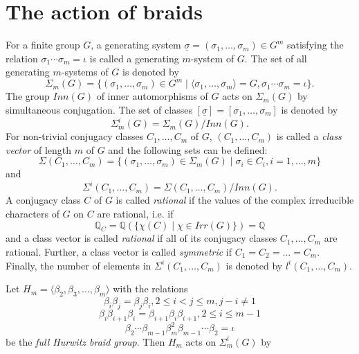 \documentclass[12pt,a4paper]{article}
\numberwithin{equation}{section}
\numberwithin{table}{section}
\begin{document}
\section{The action of braids}\label{SectionTheActionOfBraids}

For a finite group $G$, a generating system $\underline{\sigma} = (\sigma_1, \dots, \sigma_m) \in G^m$ satisfying
the relation $\sigma_1 \cdots \sigma_m = \iota$ is called a generating $m$-system of $G$.
The set of all generating $m$-systems of $G$ is denoted by
$$\Sigma_m(G) = \{ (\sigma_1, \dots, \sigma_m) \in G^m \mid \langle \sigma_1, \dots, \sigma_m \rangle = G,
\sigma_1 \cdots \sigma_m = \iota \}.$$
The group $Inn(G)$ of inner automorphisms of $G$ acts on $\Sigma_m(G)$ by simultaneous conjugation. 
The set of classes $[\underline{\sigma}] = [\sigma_1, \dots, \sigma_m]$ is denoted by
$$\Sigma^i_m(G) = \Sigma_m(G)/Inn(G).$$
For non-trivial conjugacy classes $C_1,\dots, C_m$ of $G$, $(C_1,\dots, C_m)$ is called a 
{\it class vector} of length $m$ of $G$ and the following sets can be defined:
$$\Sigma(C_1,\dots, C_m) = \{ (\sigma_1, \dots, \sigma_m) \in \Sigma_m(G) \mid \sigma_i \in C_i, i = 1, \dots, m\}$$
and
$$\Sigma^i(C_1,\dots, C_m) = \Sigma(C_1,\dots, C_m)/Inn(G).$$
A conjugacy class $C$ of $G$ is called {\it rational} if the values of the complex irreducible characters
of $G$ on $C$ are rational, i.e. if  
$$\mathbb{Q}_C = \mathbb{Q}(\{ \chi(C) \mid \chi \in Irr(G)\}) = \mathbb{Q}$$
and a class vector is called {\it rational} if all of its conjugacy classes $C_1,\dots, C_m$ are rational.
Further, a class vector is called {\it symmetric} if $C_1 = C_2 =\dots = C_m$.
Finally, the number of elements in $\Sigma^i(C_1,\dots, C_m)$ is denoted by $l^i(C_1,\dots, C_m)$.
\par
\noindent
\smallskip
Let $H_m = \langle \beta_2, \beta_3, \dots, \beta_m \rangle$ with the relations
\begin{equation} 
\label{eq:BraidRelation1}
\beta_i \beta_j = \beta_j \beta_i, 2 \leq i < j \leq m, j-i \neq 1
\end{equation}
\begin{equation} 
\label{eq:BraidRelation2}
\beta_i \beta_{i+1} \beta_i = \beta_{i+1} \beta_i \beta_{i+1}, 2 \leq i \leq m-1
\end{equation}
\begin{equation} 
\label{eq:BraidRelation3}
\beta_2 \cdots \beta_{m-1} \beta_m^2 \beta_{m-1} \cdots \beta_2 = \iota
\end{equation}
be the {\it full Hurwitz braid group}.
Then $H_m$ acts on $\Sigma^i_m(G)$ by
\end{document}
